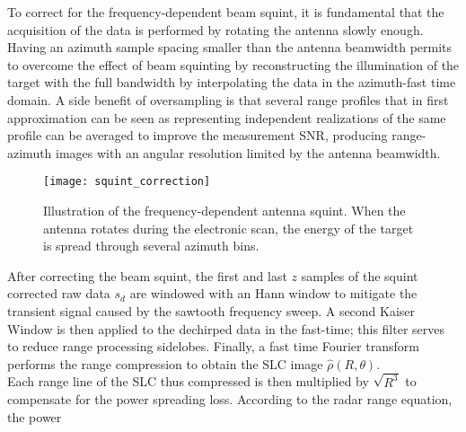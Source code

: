 To correct for the frequency-dependent beam squint, it is fundamental that the acquisition of the data is performed by rotating the antenna slowly enough. Having an azimuth sample spacing smaller than the antenna beamwidth permits to overcome the effect of beam squinting by reconstructing the illumination of the target with the full bandwidth by interpolating the data in the azimuth-fast time domain. A side benefit of oversampling is that several range profiles that in first approximation can be seen as representing independent realizations of the same profile can be averaged to improve the measurement SNR, producing range-azimuth images with an angular resolution limited by the antenna beamwidth.\\
\begin{figure}[ht]
	\centering
	\texttt{[image: squint\_correction]}
	\caption{Illustration of the frequency-dependent antenna squint. When the antenna rotates during the electronic scan, the energy of the target is spread through several azimuth bins.}
	\label{fig:squint_correction}
\end{figure}
After correcting the beam squint,  the first and last $z$ samples of the squint corrected raw data $s_{d}$ are windowed with an Hann window to mitigate the transient signal caused by the sawtooth frequency sweep. A second Kaiser Window is then applied to the dechirped data in the fast-time; this filter serves to reduce range processing sidelobes. Finally, a fast time Fourier transform performs the range compression to obtain the SLC image $\hat{\rho}\left(R, \theta\right)$.\\ Each range line of the SLC thus compressed is then multiplied by $\sqrt{R^3}$ to compensate for the power spreading loss. According to the radar range equation, the power
